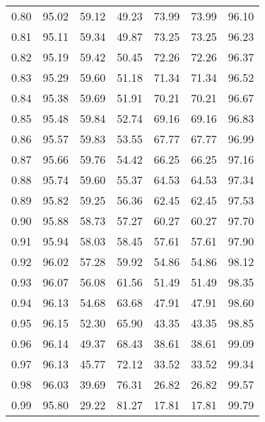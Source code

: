 \begin{tabular}{|c|c|c|c|c|c|c|}
      0.80 &     95.02 &     59.12 &      49.23 &   73.99 &      73.99 &         96.10 \\
      0.81 &     95.11 &     59.34 &      49.87 &   73.25 &      73.25 &         96.23 \\
      0.82 &     95.19 &     59.42 &      50.45 &   72.26 &      72.26 &         96.37 \\
      0.83 &     95.29 &     59.60 &      51.18 &   71.34 &      71.34 &         96.52 \\
      0.84 &     95.38 &     59.69 &      51.91 &   70.21 &      70.21 &         96.67 \\
      0.85 &     95.48 &     59.84 &      52.74 &   69.16 &      69.16 &         96.83 \\
      0.86 &     95.57 &     59.83 &      53.55 &   67.77 &      67.77 &         96.99 \\
      0.87 &     95.66 &     59.76 &      54.42 &   66.25 &      66.25 &         97.16 \\
      0.88 &     95.74 &     59.60 &      55.37 &   64.53 &      64.53 &         97.34 \\
      0.89 &     95.82 &     59.25 &      56.36 &   62.45 &      62.45 &         97.53 \\
      0.90 &     95.88 &     58.73 &      57.27 &   60.27 &      60.27 &         97.70 \\
      0.91 &     95.94 &     58.03 &      58.45 &   57.61 &      57.61 &         97.90 \\
      0.92 &     96.02 &     57.28 &      59.92 &   54.86 &      54.86 &         98.12 \\
      0.93 &     96.07 &     56.08 &      61.56 &   51.49 &      51.49 &         98.35 \\
      0.94 &     96.13 &     54.68 &      63.68 &   47.91 &      47.91 &         98.60 \\
      0.95 &     96.15 &     52.30 &      65.90 &   43.35 &      43.35 &         98.85 \\
      0.96 &     96.14 &     49.37 &      68.43 &   38.61 &      38.61 &         99.09 \\
      0.97 &     96.13 &     45.77 &      72.12 &   33.52 &      33.52 &         99.34 \\
      0.98 &     96.03 &     39.69 &      76.31 &   26.82 &      26.82 &         99.57 \\
      0.99 &     95.80 &     29.22 &      81.27 &   17.81 &      17.81 &         99.79 \\
\bottomrule
\end{tabular}
